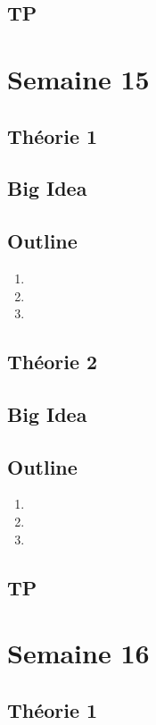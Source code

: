 \documentclass{article}
\begin{document}
\subsection{TP}

\pagebreak
\section{Semaine 15}
\subsection{Théorie 1}
\subsection*{Big Idea}
\subsection*{Outline}
    \begin{enumerate}
    \item
    \item
    \item
    \end{enumerate}
\subsection{Théorie 2}
\subsection*{Big Idea}
\subsection*{Outline}
    \begin{enumerate}
    \item
    \item
    \item
    \end{enumerate}
\subsection{TP}

\pagebreak
\section{Semaine 16}
\subsection{Théorie 1}
\end{document}
